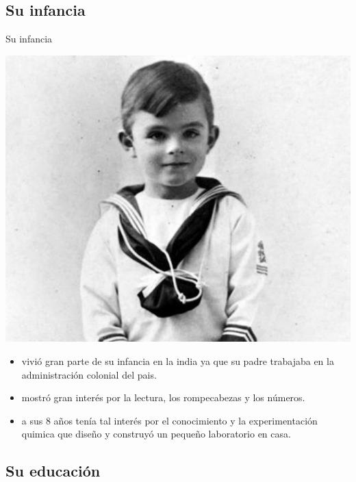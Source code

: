 \documentclass{beamer}
\begin{document}
\subsection{Su infancia}
\begin{frame}{Su infancia}
    \begin{center}
        \includegraphics[scale=0.2]{turing0.png}
    \end{center}
\begin{itemize}
     \item vivió gran parte de su infancia en la india ya que su padre trabajaba en la administración colonial del pais.\pause
    \item mostró gran interés por la lectura, los rompecabezas y los números.\pause
    \item a sus 8 años tenía tal interés por el conocimiento y la experimentación quimica que diseño y construyó un pequeño laboratorio en casa. 
\end{itemize}

\end{frame}
\subsection{Su educación}
\end{document}

